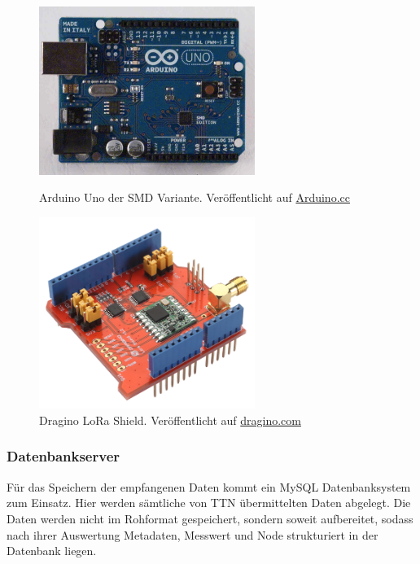 \begin{figure}[H]
	\centering
	\begin{minipage}[t]{0.45\linewidth}
		\includegraphics[width=7cm]{figures/ArduinoUnoSMDFront.jpg}
		\caption{Arduino Uno der SMD Variante. Veröffentlicht auf \href{https://www.arduino.cc/en/Main/ArduinoBoardUnoSMD}{Arduino.cc}}
		\label{fig:ardoinoUno}
	\end{minipage}
	\hfill
	\begin{minipage}[t]{0.45\linewidth}
		\includegraphics[width=7cm]{figures/LoraShield-1.png}
		\caption{Dragino LoRa Shield. Veröffentlicht auf \href{http://www.dragino.com/products/lora/item/102-lora-shield.html}{dragino.com}}
		\label{fig:draginoShield}
	\end{minipage}
\end{figure}

\subsubsection{Datenbankserver}
Für das Speichern der empfangenen Daten kommt ein MySQL Datenbanksystem zum Einsatz. Hier werden sämtliche von TTN übermittelten Daten abgelegt. Die Daten werden nicht im Rohformat gespeichert, sondern soweit aufbereitet, sodass nach ihrer Auswertung Metadaten, Messwert und Node strukturiert in der Datenbank liegen.

